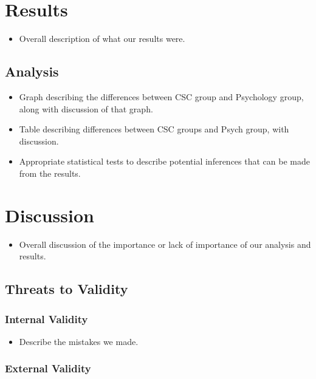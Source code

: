\documentclass{sig-alternate-05-2015}
\begin{document}
\section{Results}

\begin{itemize}
    \item Overall description of what our results were.
\end{itemize}

\subsection{Analysis}

\begin{itemize}
    \item Graph describing the differences between CSC group and Psychology group, along with discussion of that graph.
    \item Table describing differences between CSC groups and Psych group, with discussion.
    \item Appropriate statistical tests to describe potential inferences that can be made from the results.
\end{itemize}

\section{Discussion}

\begin{itemize}
    \item Overall discussion of the importance or lack of importance of our analysis and results.
\end{itemize}

\subsection{Threats to Validity}

\subsubsection{Internal Validity}

\begin{itemize}
    \item Describe the mistakes we made.
\end{itemize}

\subsubsection{External Validity}
\end{document}
